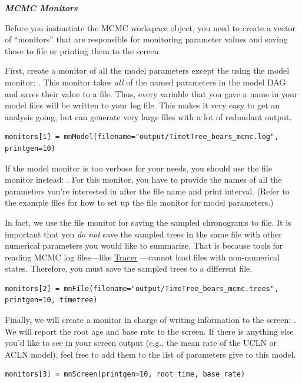 \textbf{\textit{MCMC Monitors}}

Before you instantiate the MCMC workspace object, you need to create a vector of ``monitors'' that are responsible for monitoring parameter values and saving those to file or printing them to the screen. 

First, create a monitor of all the model parameters except the  using the model monitor: .
This monitor takes \textit{all} of the named parameters in the model DAG and saves their value to a file. 
Thus, every variable that you gave a name in your model files will be written to your log file. 
This makes it very easy to get an analysis going, but can generate very large files with a lot of redundant output. 
{\tt \begin{snugshade*}
\begin{lstlisting}
monitors[1] = mnModel(filename="output/TimetTree_bears_mcmc.log", printgen=10)
\end{lstlisting}
\end{snugshade*}}

If the model monitor is too verbose for your needs, you should use the file monitor instead: . For this monitor, you have to provide the names of all the parameters you're interested in after the file name and print interval. 
(Refer to the example files for how to set up the file monitor for model parameters.)

In fact, we use the file monitor for saving the sampled chronograms to file. 
It is important that you \textit{do not} save the sampled trees in the same file with other numerical parameters you would like to summarize. That is because tools for reading MCMC log files---like \href{http://tree.bio.ed.ac.uk/software/tracer/}{Tracer} \citep{rambaut09}---cannot load files with non-numerical states.
Therefore, you must save the sampled trees to a different file.
{\tt \begin{snugshade*}
\begin{lstlisting}
monitors[2] = mnFile(filename="output/TimeTree_bears_mcmc.trees", printgen=10, timetree)
\end{lstlisting}
\end{snugshade*}}


Finally, we will create a monitor in charge of writing information to the screen: .
We will report the root age and base rate to the screen. If there is anything else you'd like to see in your screen output (e.g., the mean rate of the UCLN or ACLN model), feel free to add them to the list of parameters give to this model.
{\tt \begin{snugshade*}
\begin{lstlisting}
monitors[3] = mnScreen(printgen=10, root_time, base_rate)
\end{lstlisting}
\end{snugshade*}}

